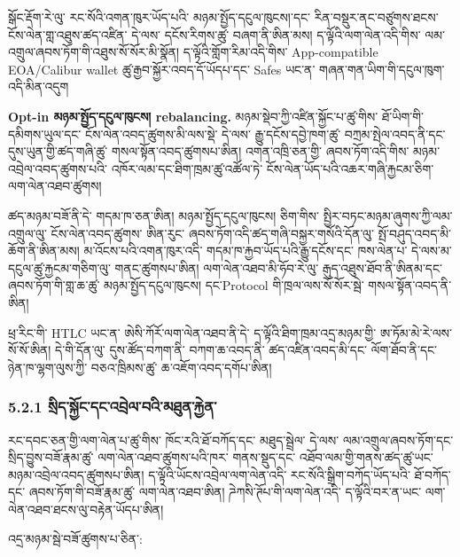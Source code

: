 \documentclass[11pt]{article}
\begin{document}
སྒོང་རྡོག་རེ་ལུ་ རང་སོའི་འགན་ཁུར་ཡོད་པའི་ མཉམ་སྤྱོད་དངུལ་ཁུངས།་དང་ རིན་བསྡུར་ནང་བཙུགས་ཐངས་ ངོས་ལེན་གླ་འཐུས་ཚད་འཛིན་ དེ་ལས་ དངོས་རིགས་ཚུ་ བཞག་ནི་ཨིན་མས། ད་ལྟོའི་ལག་ལེན་འདི་གིས་ ལམ་འགྲུལ་ཞབས་ཏོག་གི་འཐུས་སོ་སོར་མི་སྣོན། ད་ལྟོའི་གློག་རིམ་འདི་གིས་ App-compatible EOA/Calibur wallet ཚུ་རྒྱབ་སྐྱོར་འབད་དོ་ཡོདཔ་དང་ Safes ཡང་ན་ གཞན་གན་ཡིག་གི་དངུལ་ཁུག་འདི་མིན་འདུག

\textbf{Opt-in མཉམ་སྤྱོད་དངུལ་ཁུངས། rebalancing.} མཉམ་སྡེབ་ཀྱི་འཛིན་སྐྱོང་པ་ཚུ་གིས་ ཐོ་ཡིག་གི་དམིགས་ཡུལ་དང་ ངོས་ལེན་འབད་ཚུགས་མི་ལས་སྡེ་ དེ་ལས་ རྒྱུ་དངོས་དབྱེ་ཁག་ཚུ་ བཀྲམ་སྤེལ་འབད་ནི་དང་ དུས་ཡུན་གྱི་ཚད་གཞི་ཚུ་ གསལ་སྟོན་འབད་ཚུགསཔ་ཨིན། འགན་འཁྲི་ཅན་གྱི་ ཞབས་ཏོག་འདི་གིས་ མཉམ་འབྲེལ་འབད་ཚུགས་པའི་ འཁོར་ལམ་དང་ཐིག་ཁྲམ་ཚུ་འཚོལ་ཏེ་ ངོས་ལེན་ཡོད་པའི་འཆར་གཞི་རྐྱངམ་ཅིག་ ལག་ལེན་འཐབ་ཚུགས།

ཚད་མཉམ་བཟོ་ནི་དེ་ གདམ་ཁ་ཅན་ཨིན། མཉམ་སྤྱོད་དངུལ་ཁུངས། ཅིག་གིས་ སྤྱིར་བཏང་མཉམ་ཞུགས་ཀྱི་ལམ་འགྲུལ་ལུ་ ངོས་ལེན་འབད་ཚུགས་ ཨིན་རུང་ ཞབས་ཏོག་འདི་ཚད་གཞི་བསྐྱར་གསོའི་དོན་ལུ་ སྤོ་བཤུད་འབད་མི་ཆོག་ནི་ཨིན་མས། མ་འོངས་པའི་འགན་ཁུར་འདི་ གདམ་ཁ་རྐྱབ་ཡོད་པའི་རྒྱུ་དངོས་དང་ ཁས་ལེན་པ་ དེ་ལས་མ་དངུལ་ཚུ་རྐྱངམ་གཅིག་ལུ་ གནང་ཚུགསཔ་ཨིན། ལག་ལེན་འཐབ་མི་ཧོབ་རེ་ལུ་ རྒུད་འཐུས་ཐོབ་ནི་ཨིནམ་དང་ ཞབས་ཏོག་གི་གླ་ཆ་ཚུ་ མཉམ་སྤྱོད་དངུལ་ཁུངས། དང་Protocol གི་ཁྲལ་ལས་སོ་སོར་སྦེ་ གསལ་སྟོན་འབད་ནི་ཨིན།

ཕྲ་རིང་གི་ HTLC ཡང་ན་ ཨེསི་ཀོརོ་ལག་ལེན་འཐབ་ནི་དེ་ ད་ལྟོའི་ཐིག་ཁྲམ་འདྲ་མཉམ་གྱི་ ཨ་ཏོམ་མེ་རེ་ལས་སོ་སོ་ཨིན། དེ་གི་དོན་ལུ་ དུས་ཚོད་བཀག་ནི་ བཀག་ཆ་འབད་ནི་ ཚད་འཛིན་འབད་མི་དང་ ལོག་ཐོབ་ནི་དང་ ཉེན་ཁ་ལྷག་ལུས་ཀྱི་ བཅའ་ཁྲིམས་ཚུ་ ཆ་འཇོག་འབད་དགོཔ་ཨིན།

\subsubsection*{5.2.1 སྲིད་སྐྱོང་དང་འབྲེལ་བའི་མཐུན་རྐྱེན་}

རང་དབང་ཅན་གྱི་ལག་ལེན་པ་ཚུ་གིས་ ཁོང་རའི་ཐོ་བཀོད་དང་ མཐུད་སྦྲེལ་ དེ་ལས་ ལམ་འགྲུལ་ཞབས་ཏོག་དང་ སྲིད་བྱུས་བཟོ་རྣམ་ཚུ་ ལག་ལེན་འཐབ་ཚུགས་པའི་ཁར་ གནས་སྡུད་དང་ འཐོབ་ལམ་གྱི་གནས་ཚད་ཚུ་ཡང་ མཉམ་འབྲེལ་འབད་ཚུགསཔ་ཨིན། ད་ལྟོའི་ཡོངས་འབྲེལ་ལག་ལེན་འདི་ རང་སོའི་སྒྲིག་བཀོད་ཡོད་པའི་ ཐོ་བཀོད་དང་ ཞབས་ཏོག་གི་བཟོ་རྣམ་ཚུ་ ལག་ལེན་འཐབ་ཨིན། ཌེཀསི་ཊོཔ་གི་ལག་ལེན་འདི་ ད་ལྟོའི་བར་ན་ཡང་ ལག་ལེན་འཐབ་ཐངས་ལུ་བརྟེན་ཡོདཔ་ཨིན།

འདྲ་མཉམ་སྦེ་བཟོ་ཚུགས་པ་ཅིན་:
\end{document}

